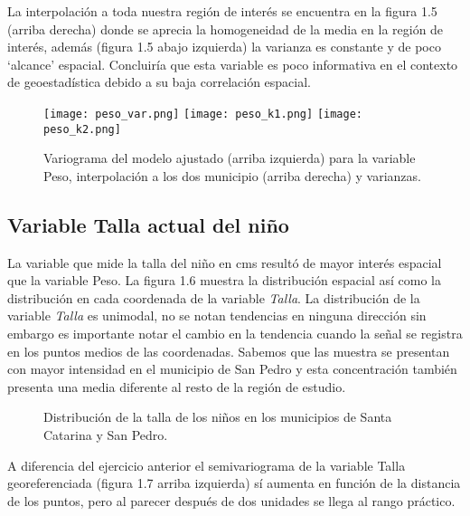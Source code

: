 \documentclass[paper=letter, fontsize=11pt]{scrartcl}
\numberwithin{equation}{section} %
\numberwithin{figure}{section} %
\numberwithin{table}{section} %
\begin{document}
\begin{enumerate}
\begin{enumerate}
La interpolación a toda nuestra región de interés se encuentra en la figura 1.5 (arriba derecha) donde se aprecia la homogeneidad de la media en la región de interés, además (figura 1.5 abajo izquierda) la varianza es constante y de poco ‘alcance’ espacial. Concluiría que esta variable es poco informativa en el contexto de geoestadística debido a su baja correlación espacial.



\begin{figure}[htbp]
\texttt{[image: peso\_var.png]}
\texttt{[image: peso\_k1.png]}
\texttt{[image: peso\_k2.png]}
\caption{Variograma del modelo ajustado (arriba izquierda) para la variable Peso, interpolación a los dos municipio (arriba derecha) y varianzas.}
\label{img1}
\end{figure}
\FloatBarrier     



\subsection*{Variable Talla actual del niño}

La variable que mide la talla del niño en cms resultó de mayor interés espacial que la variable Peso. La figura 1.6 muestra la distribución espacial así como la distribución en cada coordenada de la variable \textit{Talla}. La distribución de la variable \textit{Talla} es unimodal, no se notan tendencias en ninguna dirección sin embargo es importante notar el cambio en la tendencia cuando la señal se registra en los puntos medios de las coordenadas. Sabemos que las muestra se presentan con mayor intensidad en el municipio de San Pedro y esta concentración también presenta una media diferente al resto de la región de estudio.

 
  
\begin{figure}[htbp]
\caption{Distribución de la talla de los niños en los municipios de Santa Catarina y San Pedro.}
\label{img1}
\end{figure}
\FloatBarrier
 
A diferencia del ejercicio anterior el semivariograma de la variable Talla georeferenciada (figura 1.7 arriba izquierda) sí aumenta en función de la distancia de los puntos, pero al parecer después de dos unidades se llega al rango práctico.\\


\end{enumerate}
\end{enumerate}
\end{document}
